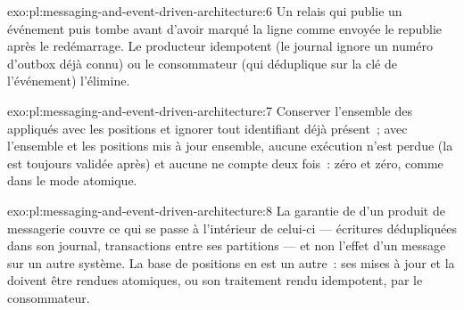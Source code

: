 \begin{solution}{exo:pl:messaging-and-event-driven-architecture:6}
Un relais qui publie un événement puis tombe avant d'avoir marqué la ligne comme envoyée le republie après le redémarrage. Le producteur idempotent (le journal
ignore un numéro d'outbox déjà connu) ou le consommateur (qui déduplique sur la clé de l'événement) l'élimine.
\end{solution}

\begin{solution}{exo:pl:messaging-and-event-driven-architecture:7}
Conserver l'ensemble des  appliqués avec les positions et ignorer tout identifiant déjà présent~; avec l'ensemble et les positions mis à jour
ensemble, aucune exécution n'est perdue (la  est toujours validée après) et aucune ne compte deux fois~: zéro et zéro, comme dans le mode atomique.
\end{solution}

\begin{solution}{exo:pl:messaging-and-event-driven-architecture:8}
La garantie de  d'un produit de messagerie couvre ce qui se passe à l'intérieur de celui-ci --- écritures dédupliquées dans son journal, transactions entre ses partitions ---
et non l'effet d'un message sur un autre système. La base de positions en est un autre~: ses mises à jour et la  doivent être rendues
atomiques, ou son traitement rendu idempotent, par le consommateur.
\end{solution}

